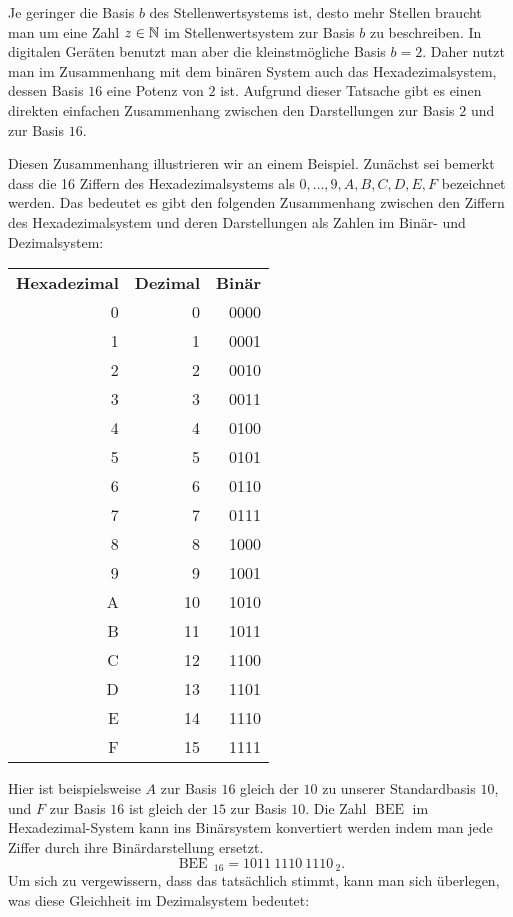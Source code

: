 \begin{bsp}
	Je geringer die Basis $b$ des Stellenwertsystems ist, desto mehr Stellen braucht man um eine Zahl $z \in \mathbb{N}$ im Stellenwertsystem zur Basis $b$ zu beschreiben. In digitalen Geräten benutzt man aber die kleinstmögliche Basis $b=2$. Daher nutzt man im Zusammenhang mit dem binären System auch das Hexadezimalsystem, dessen Basis $16$ eine Potenz von $2$ ist. Aufgrund dieser Tatsache gibt es einen direkten einfachen Zusammenhang zwischen den Darstellungen zur  Basis $2$ und zur Basis $16$. 
	
	Diesen Zusammenhang illustrieren wir an einem Beispiel. Zunächst sei bemerkt dass die 16 Ziffern des Hexadezimalsystems als $0,\ldots,9,A,B,C,D,E,F$ bezeichnet werden. Das bedeutet es gibt den folgenden Zusammenhang zwischen den Ziffern des Hexadezimalsystem und deren Darstellungen als Zahlen im Binär- und Dezimalsystem: 
	\begin{center}
		\scriptsize 
		\begin{tabular}{rrr}
			\textbf{Hexadezimal} & \textbf{Dezimal} & \textbf{Binär}
			\\ 0 & 0 & 0000
			\\ 1 & 1 & 0001
			\\ 2 & 2 & 0010
			\\ 3 & 3 & 0011
			\\ 4 & 4 & 0100
			\\ 5 & 5 & 0101
			\\ 6 & 6 & 0110
			\\ 7 & 7 & 0111
			\\ 8 & 8 & 1000
			\\ 9 & 9 & 1001
			\\ A & 10 & 1010
			\\ B & 11 & 1011
			\\ C & 12 & 1100
			\\ D & 13 & 1101
			\\ E & 14 & 1110
			\\ F & 15 & 1111
		\end{tabular}
	\end{center}
	Hier ist beispielsweise $A$ zur Basis $16$ gleich der $10$ zu unserer Standardbasis $10$, und $F$ zur Basis $16$ ist gleich der $15$ zur Basis $10$. Die Zahl $\operatorname{BEE}$ im Hexadezimal-System kann ins Binärsystem konvertiert werden indem man jede Ziffer durch ihre Binärdarstellung ersetzt. 
	\[
	\operatorname{BEE} \, {}_{16} = 1011 \ 1110 \ 1110 \, {}_{2}.
	\]
	Um sich zu vergewissern, dass das tatsächlich stimmt, kann man sich überlegen, was diese Gleichheit im Dezimalsystem bedeutet:

\end{bsp}
